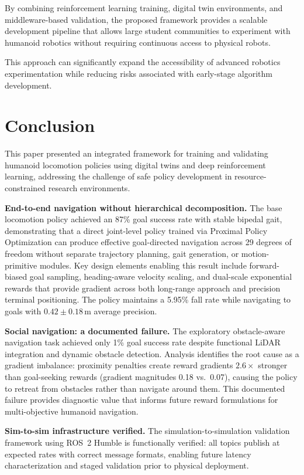\documentclass[pdflatex,sn-mathphys-num]{sn-jnl}%
\theoremstyle{thmstyleone}%
\theoremstyle{thmstyletwo}%
\theoremstyle{thmstylethree}%
\begin{document}
By combining reinforcement learning training, digital twin environments, and middleware-based validation, the proposed framework provides a scalable development pipeline that allows large student communities to experiment with humanoid robotics without requiring continuous access to physical robots.

This approach can significantly expand the accessibility of advanced robotics experimentation while reducing risks associated with early-stage algorithm development.

\section{Conclusion}
\label{conclusion}

This paper presented an integrated framework for training and validating humanoid
locomotion policies using digital twins and deep reinforcement learning,
addressing the challenge of safe policy development in resource-constrained
research environments.

\textbf{End-to-end navigation without hierarchical decomposition.}
The base locomotion policy achieved an 87\% goal success rate with stable bipedal
gait, demonstrating that a direct joint-level policy trained via Proximal Policy
Optimization can produce effective goal-directed navigation across 29 degrees of
freedom without separate trajectory planning, gait generation, or motion-primitive
modules.
Key design elements enabling this result include forward-biased goal sampling,
heading-aware velocity scaling, and dual-scale exponential rewards that provide
gradient across both long-range approach and precision terminal positioning.
The policy maintains a 5.95\% fall rate while navigating to goals with
$0.42 \pm 0.18$\,m average precision.

\textbf{Social navigation: a documented failure.}
The exploratory obstacle-aware navigation task achieved only 1\% goal success rate
despite functional LiDAR integration and dynamic obstacle detection.
Analysis identifies the root cause as a gradient imbalance: proximity penalties
create reward gradients $2.6\times$ stronger than goal-seeking rewards (gradient
magnitudes 0.18 vs.\ 0.07), causing the policy to retreat from obstacles rather
than navigate around them.
This documented failure provides diagnostic value that informs future reward
formulations for multi-objective humanoid navigation.

\textbf{Sim-to-sim infrastructure verified.}
The simulation-to-simulation validation framework using ROS~2 Humble is
functionally verified: all topics publish at expected rates with correct message
formats, enabling future latency characterization and staged validation prior to
physical deployment.
\end{document}
